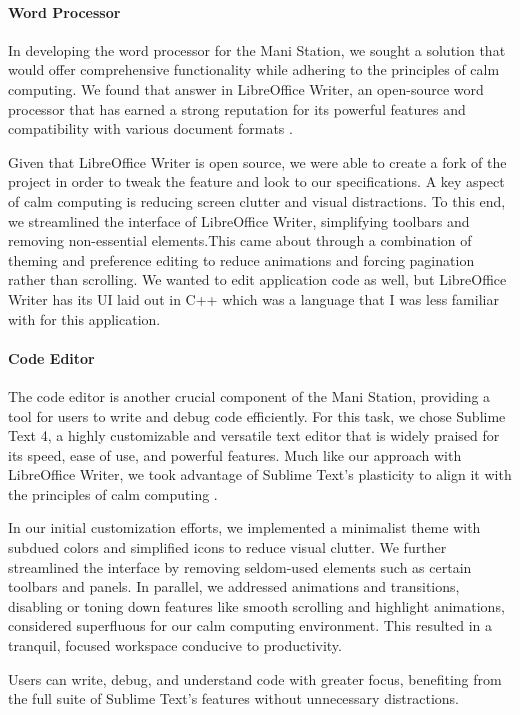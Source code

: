 \documentclass[letterpaper,twocolumn,10pt]{article}
\begin{document}
\paragraph{Word Processor}
In developing the word processor for the Mani Station, we sought a solution that would offer comprehensive functionality while adhering to the principles of calm computing. We found that answer in LibreOffice Writer, an open-source word processor that has earned a strong reputation for its powerful features and compatibility with various document formats \cite{writing-in-linux}.

Given that LibreOffice Writer is open source, we were able to create a fork of the project in order to tweak the feature and look to our specifications. A key aspect of calm computing is reducing screen clutter and visual distractions. To this end, we streamlined the interface of LibreOffice Writer, simplifying toolbars and removing non-essential elements.This came about through a combination of theming and preference editing to reduce animations and forcing pagination rather than scrolling. We wanted to edit application code as well, but LibreOffice Writer has its UI laid out in C++ which was a language that I was less familiar with for this application.
\paragraph{Code Editor}
The code editor is another crucial component of the Mani Station, providing a tool for users to write and debug code efficiently. For this task, we chose Sublime Text 4, a highly customizable and versatile text editor that is widely praised for its speed, ease of use, and powerful features. Much like our approach with LibreOffice Writer, we took advantage of Sublime Text's plasticity to align it with the principles of calm computing \cite{sublime}. 

In our initial customization efforts, we implemented a minimalist theme with subdued colors and simplified icons to reduce visual clutter. We further streamlined the interface by removing seldom-used elements such as certain toolbars and panels. In parallel, we addressed animations and transitions, disabling or toning down features like smooth scrolling and highlight animations, considered superfluous for our calm computing environment. This resulted in a tranquil, focused workspace conducive to productivity.

Users can write, debug, and understand code with greater focus, benefiting from the full suite of Sublime Text's features without unnecessary distractions.
\end{document}
